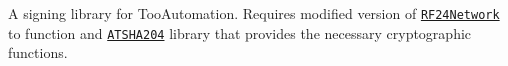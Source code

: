A signing library for Too\+Automation. Requires modified version of \href{https://github.com/Avamander/RF24Network}{\tt R\+F24\+Network} to function and \href{https://github.com/Cathedrow/Cryptosuite}{\tt A\+T\+S\+H\+A204} library that provides the necessary cryptographic functions. 
